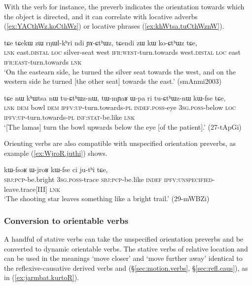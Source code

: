 With the verb  for instance, the preverb indicates the orientation towards which the object is directed, and it can correlate with locative adverbs (\ref{ex:YACthWz.koCthWz}) or locative phrases (\ref{ex:khWtsa.tuCthWznW}).  

 \begin{exe}
\ex \label{ex:YACthWz.koCthWz}
\gll  tɕe tɕekɯ zɯ rŋɯl-kʰri ndi ɲɤ-ɕtʰɯz, tɕendi zɯ kɯ ko-ɕtʰɯz tɕe, \\
\textsc{lnk} east.\textsc{distal} \textsc{loc} silver-seat west \textsc{ifr}:\textsc{west}-turn.towards west.\textsc{distal} \textsc{loc} east \textsc{ifr}:\textsc{east}-turn.towards  \textsc{lnk} \\
\glt `On the eastearn side, he turned the silver seat towards the west, and on the western side he turned [the other seat] towards the east.' (smAnmi2003)
 \end{exe}
 
\begin{exe}
\ex \label{ex:khWtsa.tuCthWznW}
\gll  tɕe nɯ kʰɯtsa nɯ tu-ɕtʰɯz-nɯ, tɯ-mɲaʁ ɯ-pa ri tu-ɕtʰɯz-nɯ kɯ-fse tɕe, \\
\textsc{lnk} \textsc{dem} bowl \textsc{dem} \textsc{ipfv}:\textsc{up}-turn.towards-\textsc{pl} \textsc{indef}.\textsc{poss}-eye \textsc{3sg}.\textsc{poss}-below \textsc{loc}  \textsc{ipfv}:\textsc{up}-turn.towards-\textsc{pl} \textsc{inf}:\textsc{stat}-be.like \textsc{lnk} \\
 \glt `[The lamas] turn the bowl upwards below the eye [of the patient].' (27-tApGi)
\end{exe}

Orienting verbs are also compatible with unspecified orientation preverbs, as example (\ref{ex:WjroR.juthi}) shows.

\begin{exe}
\ex \label{ex:WjroR.juthi}
\gll   kɯ-fsoʁ ɯ-jroʁ kɯ-fse ci ju-tʰi tɕe, \\
\textsc{sbj}:\textsc{pcp}-be.bright \textsc{3sg}.\textsc{poss}-trace \textsc{sbj}:\textsc{pcp}-be.like \textsc{indef} \textsc{ipfv}:\textsc{unspecified}-leave.trace[III] \textsc{lnk} \\
\glt `The shooting star leaves something like a bright trail.' (29-mWBZi)
  \end{exe}
  
\subsubsection{Conversion to orientable verbs} \label{sec:convertion.orientable.verbs}
A handful of stative verbs can take the unspecified orientation preverbs and be converted to dynamic orientable verbs. The stative verbs of relative location  and   can be used in the meanings `move closer' and `move further away' identical to the reflexive-causative derived verbs  and (§\ref{sec:motion.verbs}, §\ref{sec:refl.caus}), as in (\ref{ex:jarmbat.kurtoR}).

